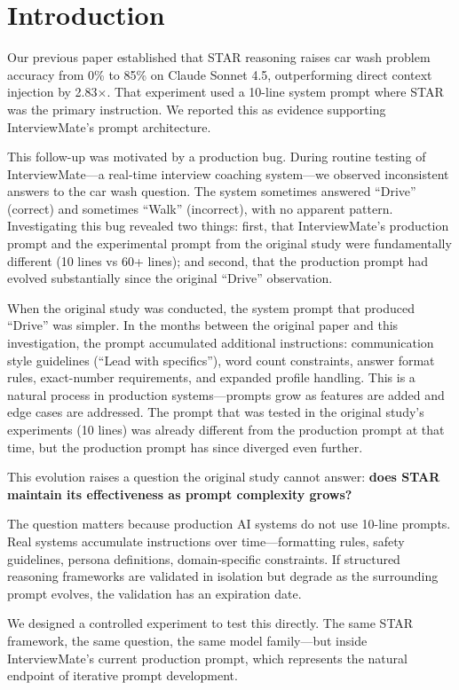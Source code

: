 \documentclass[11pt]{article}
\begin{document}
\section{Introduction}

Our previous paper \citep{jo2026} established that STAR reasoning raises car wash problem accuracy from 0\% to 85\% on Claude Sonnet 4.5, outperforming direct context injection by 2.83$\times$. That experiment used a 10-line system prompt where STAR was the primary instruction. We reported this as evidence supporting InterviewMate's prompt architecture.

This follow-up was motivated by a production bug. During routine testing of InterviewMate---a real-time interview coaching system---we observed inconsistent answers to the car wash question. The system sometimes answered ``Drive'' (correct) and sometimes ``Walk'' (incorrect), with no apparent pattern. Investigating this bug revealed two things: first, that InterviewMate's production prompt and the experimental prompt from the original study were fundamentally different (10 lines vs 60+ lines); and second, that the production prompt had evolved substantially since the original ``Drive'' observation.

When the original study was conducted, the system prompt that produced ``Drive'' was simpler. In the months between the original paper and this investigation, the prompt accumulated additional instructions: communication style guidelines (``Lead with specifics''), word count constraints, answer format rules, exact-number requirements, and expanded profile handling. This is a natural process in production systems---prompts grow as features are added and edge cases are addressed. The prompt that was tested in the original study's experiments (10 lines) was already different from the production prompt at that time, but the production prompt has since diverged even further.

This evolution raises a question the original study cannot answer: \textbf{does STAR maintain its effectiveness as prompt complexity grows?}

The question matters because production AI systems do not use 10-line prompts. Real systems accumulate instructions over time---formatting rules, safety guidelines, persona definitions, domain-specific constraints. If structured reasoning frameworks are validated in isolation but degrade as the surrounding prompt evolves, the validation has an expiration date.

We designed a controlled experiment to test this directly. The same STAR framework, the same question, the same model family---but inside InterviewMate's current production prompt, which represents the natural endpoint of iterative prompt development.
\end{document}
